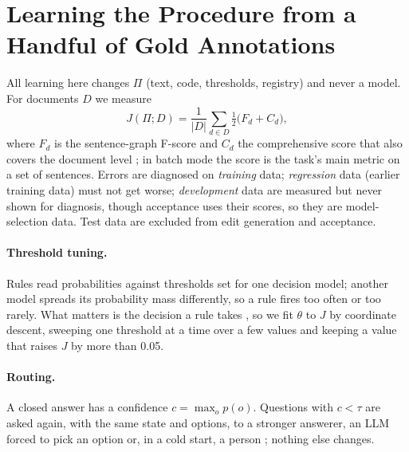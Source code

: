 \section{Learning the Procedure from a Handful of Gold Annotations}
\label{sec:learning}

All learning here changes $\Pi$ (text, code, thresholds, registry) and never a model. For \umr documents $D$ we measure
\begin{equation}
J(\Pi; D) = \frac{1}{|D|}\sum_{d \in D} \tfrac{1}{2}\bigl(F_d + C_d\bigr),
\label{eq:objective}
\end{equation}
where $F_d$ is the sentence-graph F-score and $C_d$ the comprehensive score that also covers the document level \citep{sun2024ancast}; in batch mode the score is the task's main metric on a set of sentences. Errors are diagnosed on \emph{training} data; \emph{regression} data (earlier training data) must not get worse; \emph{development} data are measured but never shown for diagnosis, though acceptance uses their scores, so they are model-selection data. Test data are excluded from edit generation and acceptance.

\paragraph{Threshold tuning.}
\label{sec:calibration}
Rules read probabilities against thresholds set for one decision model; another model spreads its probability mass differently, so a rule fires too often or too rarely. What matters is the decision a rule takes \citep[cf.][]{zhao2021calibrate}, so we fit $\theta$ to $J$ by coordinate descent, sweeping one threshold at a time over a few values and keeping a value that raises $J$ by more than 0.05.

\paragraph{Routing.}
\label{sec:routing}
A closed answer has a confidence $c=\max_o p(o)$. Questions with $c<\tau$ are asked again, with the same state and options, to a stronger answerer, an LLM forced to pick an option or, in a cold start, a person ; nothing else changes.

